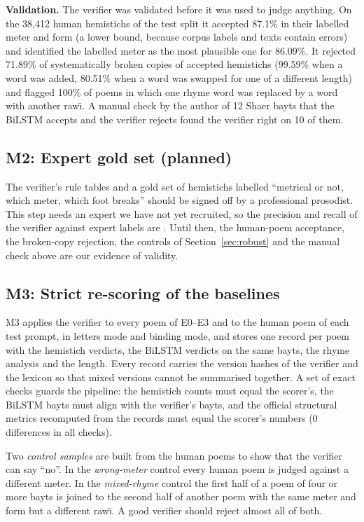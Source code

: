 \textbf{Validation.} The verifier was validated before it was used to judge anything. On the 38,412 human hemistichs
of the test split it accepted 87.1\% in their labelled meter and form (a lower bound, because corpus labels
and texts contain errors) and identified the labelled meter as the most plausible one for 86.09\%. It rejected 71.89\%
of systematically broken copies of accepted hemistichs (99.59\% when a word was added, 80.51\% when a word was swapped
for one of a different length) and flagged 100\% of poems in which one rhyme word was replaced by a word with another
raw\={\i}. A manual check by the author of 12 Shaer bayts that the BiLSTM accepts and the verifier rejects found the
verifier right on 10 of them.

\subsection{M2: Expert gold set (planned)}
\label{sec:m2}
The verifier's rule tables and a gold set of hemistichs labelled ``metrical or not, which meter, which foot breaks''
should be signed off by a professional prosodist. This step needs an expert we have not yet recruited, so the precision
and recall of the verifier against expert labels are . Until then, the human-poem acceptance, the
broken-copy rejection, the controls of Section~\ref{sec:robust} and the manual check above are our evidence of
validity.

\subsection{M3: Strict re-scoring of the baselines}
\label{sec:m3}
M3 applies the verifier to every poem of E0--E3 and to the human poem of each test prompt, in letters mode and binding
mode, and stores one record per poem with the hemistich verdicts, the BiLSTM verdicts on the same bayts, the rhyme
analysis and the length. Every record carries the version hashes of the verifier and the lexicon so that mixed
versions cannot be summarised together. A set of exact checks guards the pipeline: the hemistich counts must equal the
scorer's, the BiLSTM bayts must align with the verifier's bayts, and the official structural metrics recomputed from
the records must equal the scorer's numbers (0 differences in all checks).

Two \emph{control samples} are built from the human poems to show that the verifier can say ``no''. In the
\emph{wrong-meter} control every human poem is judged against a different meter. In the \emph{mixed-rhyme} control the
first half of a poem of four or more bayts is joined to the second half of another poem with the same meter and form
but a different raw\={\i}. A good verifier should reject almost all of both.

